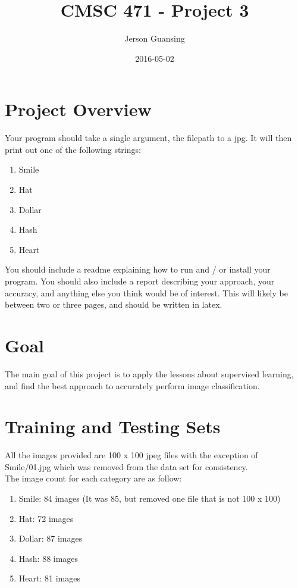 \documentclass{article}
\title{CMSC 471 - Project 3}
\date{2016-05-02}
\author{Jerson Guansing}
\begin{document}
  \maketitle
  \newpage
  \tableofcontents
  \newpage

  \section{Project Overview}
  
  Your program should take a single argument, the filepath to a jpg. It will then print out one of the following strings:\\
  \begin{enumerate}
  	\item Smile
  	\item Hat
  	\item Dollar
  	\item Hash
  	\item Heart
  \end{enumerate}
  You should include a readme explaining how to run and / or install your program. You should also include a report describing your approach, your accuracy, and anything else you think would be of interest. This will likely be between two or three pages, and should be written in latex.\\
  
  \section{Goal}
  
  The main goal of this project is to apply the lessons about supervised learning, and find the best approach to accurately perform image classification.
  
  
  \section{Training and Testing Sets}
  
  All the images provided are 100 x 100 jpeg files with the exception of Smile/01.jpg which was removed from the data set for consistency.\\
  
  The image count for each category are as follow:\\
  \begin{enumerate}
  	\item Smile: 84 images (It was 85, but removed one file that is not 100 x 100)
  	\item Hat: 72 images
  	\item Dollar: 87 images
  	\item Hash: 88 images
  	\item Heart: 81 images
  \end{enumerate}
  
\end{document}

